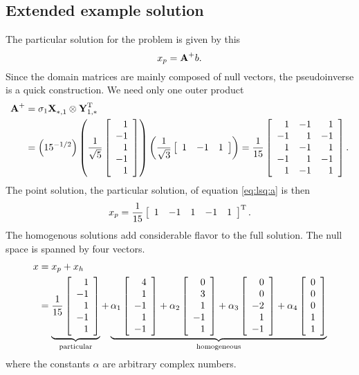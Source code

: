 \subsection{Extended example solution}
The particular solution for the problem is given by this
\begin{equation}
  x_{p} = \A{+}b.
  \label{eq:lsq:a}
\end{equation}
Since the domain matrices are mainly composed of null vectors, the pseudoinverse is a quick construction. We need only one outer product
\begin{equation}
  \begin{split}
    \A{+} &= \sigma_{1}\X{}_{*,1}\otimes \Y{T}_{1,*}\\
     &= \paren{15^{-1/2}}
     \paren{\sfive \mat{r}{1\\-1\\1\\-1\\1}}
     \paren{\sthree \mat{rrr}{1&-1&1}} =
     \frac{1}{15}\mat{rrr}{1 & -1 & 1\\-1 & 1 & -1\\1 & -1 & 1\\-1 & 1 & -1\\1 & -1 & 1}.
  \end{split}
\end{equation}
The point solution, the particular solution, of equation \eqref{eq:lsq:a} is then
\begin{equation}
  x_{p} = \frac{1}{15}\mat{rrrrr}{1 & -1 & 1 & -1 & 1}^{\mathrm{T}}.
\end{equation}
The homogenous solutions add considerable flavor to the full solution. The null space is spanned by four vectors.
\begin{equation}
  \begin{split}
    x &= x_{p} + x_{h}\\
      &= \underbrace{\frac{1}{15}\mat{r}{1\\-1\\1\\-1\\1}}_{\text{particular}}
       + \underbrace{
         \alpha_{1}  \mat{r}{4\\1\\-1\\1\\-1} 
       + \alpha_{2}  \mat{r}{0\\3\\1\\-1\\1} 
       + \alpha_{3}  \mat{r}{0\\0\\-2\\1\\-1} 
       + \alpha_{4}  \mat{r}{0\\0\\0\\1\\1}
         }_{\text{homogeneous}} 
  \end{split}
\end{equation}
where the constants $\alpha$ are arbitrary complex numbers.
 
